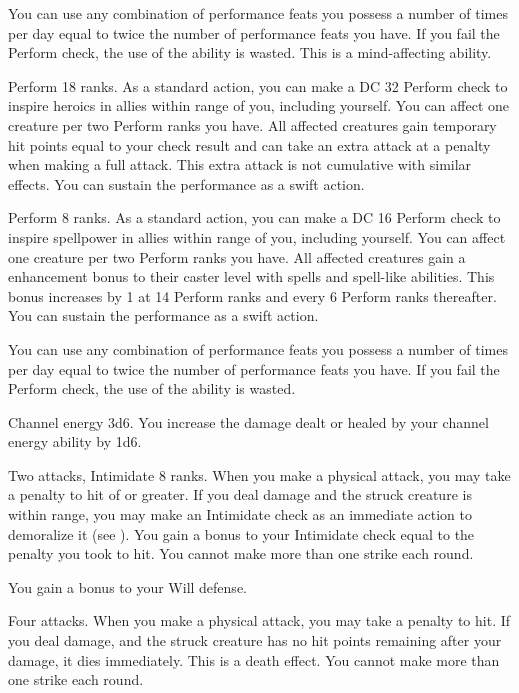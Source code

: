 You can use any combination of performance feats you possess a number of times per day equal to twice the number of performance feats you have.
If you fail the Perform check, the use of the ability is wasted.
This is a mind-affecting ability.

\featpre Perform 18 ranks.
\featben As a standard action, you can make a DC 32 Perform check to inspire heroics in allies within \rngmed range of you, including yourself.
You can affect one creature per two Perform ranks you have.
All affected creatures gain temporary hit points equal to your check result and can take an extra attack at a  penalty when making a full attack.
This extra attack is not cumulative with similar effects.
You can sustain the performance as a swift action.

\featpre Perform 8 ranks.
\featben As a standard action, you can make a DC 16 Perform check to inspire spellpower in allies within \rngmed range of you, including yourself.
You can affect one creature per two Perform ranks you have.
All affected creatures gain a  enhancement bonus to their caster level with spells and spell-like abilities.
This bonus increases by 1 at 14 Perform ranks and every 6 Perform ranks thereafter.
You can sustain the performance as a swift action.

You can use any combination of performance feats you possess a number of times per day equal to twice the number of performance feats you have.
If you fail the Perform check, the use of the ability is wasted.

\featpre Channel energy 3d6.
\featben You increase the damage dealt or healed by your channel energy ability by 1d6.

\featpres Two attacks, Intimidate 8 ranks.
\featben When you make a physical attack, you may take a penalty to hit of  or greater.
If you deal damage and the struck creature is within \rngmed range, you may make an Intimidate check as an immediate action to demoralize it (see ).
You gain a bonus to your Intimidate check equal to the penalty you took to hit.
You cannot make more than one strike each round.

\featben You gain a  bonus to your Will defense.

\featpre Four attacks.
\featben When you make a physical attack, you may take a  penalty to hit.
If you deal damage, and the struck creature has no hit points remaining after your damage, it dies immediately.
This is a death effect.
You cannot make more than one strike each round.


